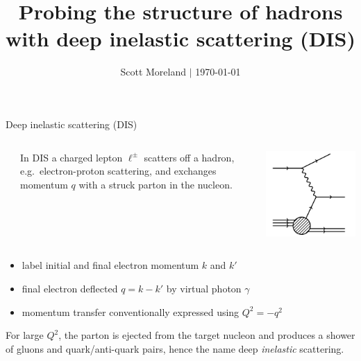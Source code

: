 \documentclass[svgnames]{beamer}
\title[DIS]{Probing the structure of hadrons \\with deep inelastic scattering (DIS)}
\author[Scott Moreland]{Scott Moreland $\vert$ \today}
\date[\today]{}
\begin{document}
\begin{frame}
    \maketitle
\end{frame}

\begin{frame}{Deep inelastic scattering (DIS)}

\begin{columns}
\begin{column}{0.05\textwidth}
\end{column}
\begin{column}{0.55\textwidth}
In DIS a charged lepton $\ell^{\pm}$ scatters off a hadron, e.g.\ electron-proton scattering, and exchanges momentum $q$ with a struck parton in the nucleon.
\end{column}
\begin{column}{0.35\textwidth}
    \includegraphics[width=0.9\columnwidth]{dis}
\end{column}
\end{columns}

\begin{itemize}
    \item label initial and final electron momentum $k$ and $k'$
    \item final electron deflected $q = k - k'$ by virtual photon $\gamma$
    \item momentum transfer conventionally expressed using $Q^2 = -q^2$
\end{itemize}
\bigskip
For large $Q^2$, the parton is ejected from the target nucleon and produces a shower of gluons and quark/anti-quark pairs, hence the name deep \emph{inelastic} scattering.
\vfill
\end{frame}
\end{document}
